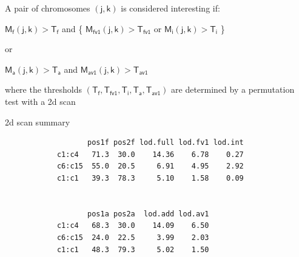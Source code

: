 \documentclass[12pt]{article}
\newcommand{\headsize}{\fontsize{35}{35} \selectfont}
\newcommand{\smallersize}{\fontsize{20}{25} \selectfont}
\newcommand{\M}{\text{M}}
\begin{document}
\hfill \begin{minipage}[t]{9.5in}
A pair of chromosomes {\color{myblue} $\mathsf{(j,k)}$} is considered interesting if:

\vspace{25mm}

{\color{myblue}
\centerline{$ \mathsf{\M_f(j,k)} > \mathsf{ T_f }$ \hspace{5mm} {\color{mypink} and } 
\hspace{5mm} 
{\color{mypink} \{} $ \mathsf{\M_{fv1}(j,k)} > \mathsf{ T_{fv1} }$ 
{\color{mypink} or } 
$ \mathsf{\M_i(j,k)} > \mathsf{ T_i }$  {\color{mypink} \}}}

\vspace{36pt}

\centerline{\color{mypink} or } 

\vspace{36pt}

\centerline{$ \mathsf{\M_a(j,k)} > \mathsf{ T_a }$ \hspace{5mm} {\color{mypink} and } 
\hspace{5mm} 
$ \mathsf{\M_{av1}(j,k)} > \mathsf{ T_{av1} }$ }
}


\vspace{25mm}

where the thresholds {\color{myblue} $\mathsf{(T_f, T_{fv1}, T_i, T_a,
    T_{av1})}$} are determined by a permutation test with a 2d scan

\end{minipage} \hspace{0.5in}


\newpage

\headsize \color{myyellow}
\hfill \begin{minipage}{5.75in}
\centering
2d scan summary
\end{minipage}

\vspace{40mm}

\color{mywhite} \smallersize

\begin{verbatim}
                   pos1f pos2f lod.full lod.fv1 lod.int
            c1:c4   71.3  30.0    14.36    6.78    0.27
            c6:c15  55.0  20.5     6.91    4.95    2.92
            c1:c1   39.3  78.3     5.10    1.58    0.09


                   pos1a pos2a  lod.add lod.av1
            c1:c4   68.3  30.0    14.09    6.50
            c6:c15  24.0  22.5     3.99    2.03
            c1:c1   48.3  79.3     5.02    1.50
\end{verbatim}
\end{document}
